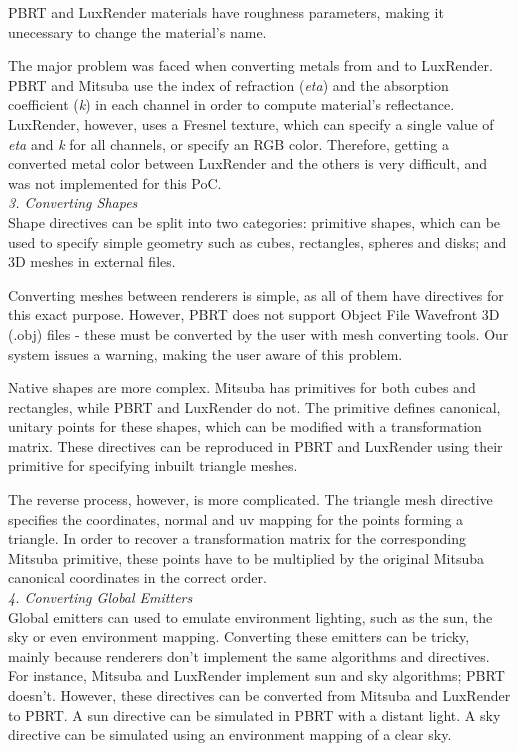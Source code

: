 PBRT and LuxRender materials have roughness parameters, making it unecessary to
change the material's name.

The major problem was faced when converting metals from and to LuxRender. PBRT 
and Mitsuba use the index of refraction (\textit{eta}) and the absorption 
coefficient (\textit{k}) in each channel in order to compute material's 
reflectance. LuxRender, however, uses a Fresnel texture, which can specify a 
single value of \textit{eta} and \textit{k} for all channels, or specify an RGB 
color. Therefore, getting a converted metal color between LuxRender and the 
others is very difficult, and was not implemented for this PoC. \\

\textit{3. Converting Shapes} \\
Shape directives can be split into two categories: primitive shapes, which can
be used to specify simple geometry such as cubes, rectangles, spheres and disks;
and 3D meshes in external files.

Converting meshes between renderers is simple, as all of them have directives
for this exact purpose. However, PBRT does not support Object File Wavefront 3D
(.obj) files - these must be converted by the user with mesh converting tools.
Our system issues a warning, making the user aware of this problem.

Native shapes are more complex. Mitsuba has primitives for both cubes and
rectangles, while PBRT and LuxRender do not. The primitive defines canonical,
unitary points for these shapes, which can be modified with a transformation
matrix. These directives can be reproduced in PBRT and LuxRender using their
primitive for specifying inbuilt triangle meshes.

The reverse process, however, is more complicated. The triangle mesh directive
specifies the coordinates, normal and uv mapping for the points forming a
triangle. In order to recover a transformation matrix for the corresponding
Mitsuba primitive, these points have to be multiplied by the original Mitsuba
canonical coordinates in the correct order. \\

\textit{4. Converting Global Emitters} \\
Global emitters can used to emulate environment lighting, such as the sun, the
sky or even environment mapping. Converting these emitters can be tricky, mainly
because renderers don't implement the same algorithms and directives. For
instance, Mitsuba and LuxRender implement sun and sky algorithms; PBRT doesn't.
However, these directives can be converted from Mitsuba and LuxRender to PBRT. A
sun directive can be simulated in PBRT with a distant light. A sky directive can
be simulated using an environment mapping of a clear sky.

